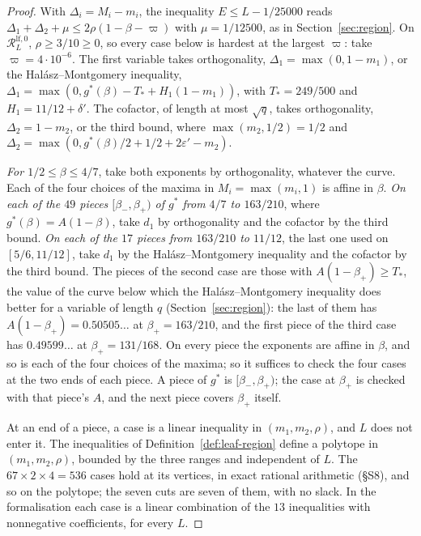 \documentclass[11pt]{article}
\theoremstyle{definition}
\begin{document}
\begin{proof}
With $\Delta_i = M_i - m_i$, the inequality $E \le L - 1/25000$ reads $\Delta_1 + \Delta_2 + \mu \le 2\rho(1 - \beta -
\varpi)$ with $\mu = 1/12500$, as in Section~\ref{sec:region}. On $\mathcal R^{\mathrm{lf},0}_L$, $\rho \ge 3/10 \ge
0$, so every case below is hardest at the largest $\varpi$: take $\varpi = 4 \cdot 10^{-6}$. The first variable takes
orthogonality, $\Delta_1 = \max(0, 1
- m_1)$, or the Hal\'asz--Montgomery inequality, $\Delta_1 = \max(0, g^*(\beta) - T_* + H_1(1 - m_1))$, with $T_* =
249/500$ and $H_1 = 11/12 + \delta'$. The cofactor,
of length at most $\sqrt q$, takes orthogonality, $\Delta_2 = 1 - m_2$, or the third bound, where $\max(m_2, 1/2) = 1/2$
and $\Delta_2 = \max(0, g^*(\beta)/2 + 1/2 + 2\varepsilon' - m_2)$.

\emph{For $1/2 \le \beta \le 4/7$}, take both exponents by orthogonality, whatever the curve. Each of the four choices
of the maxima in $M_i = \max(m_i, 1)$ is affine in $\beta$. \emph{On each of the $49$ pieces $[\beta_-, \beta_+)$ of
$g^*$ from $4/7$ to $163/210$}, where $g^*(\beta) = A(1 - \beta)$, take $d_1$ by orthogonality and the cofactor by the
third bound. \emph{On each of the $17$ pieces from $163/210$ to $11/12$}, the last one used on $[5/6, 11/12]$, take
$d_1$ by the Hal\'asz--Montgomery inequality and the cofactor by the third bound. The pieces of the second case are
those with $A(1 - \beta_+) \ge T_*$, the value of the curve below which the Hal\'asz--Montgomery inequality
does better for a variable of length $q$ (Section~\ref{sec:region}): the last of them has $A(1 - \beta_+) =
0.50505\ldots$ at $\beta_+ = 163/210$, and the first piece of the third case has $0.49599\ldots$ at $\beta_+ =
131/168$. On every
piece the exponents are affine in $\beta$, and so is each of the four choices of the maxima; so it suffices to check the
four cases at the two ends of each piece. A piece of $g^*$ is $[\beta_-, \beta_+)$; the case at $\beta_+$ is checked
with that piece's $A$, and the next piece covers $\beta_+$ itself.

At an end of a piece, a case is a linear inequality in $(m_1, m_2, \rho)$, and $L$ does not enter it. The inequalities
of Definition~\ref{def:leaf-region} define a polytope in $(m_1, m_2, \rho)$, bounded by the three ranges and
independent of $L$.
The $67 \times 2 \times 4 = 536$ cases hold at its vertices, in exact rational arithmetic (\S S8), and so on the
polytope; the seven cuts are seven of them, with no slack. In the formalisation each case
is a linear combination of the $13$ inequalities with nonnegative coefficients, for every $L$.


\end{proof}
\end{document}

